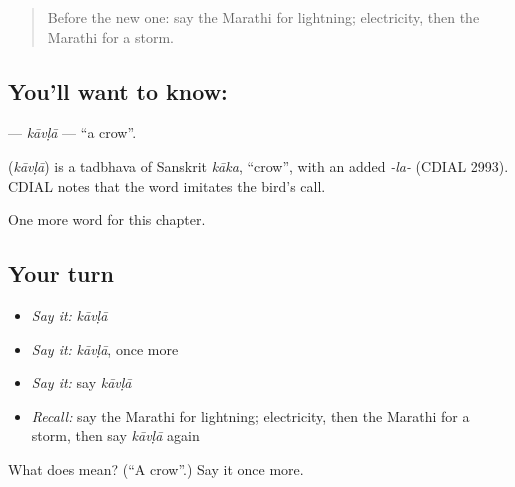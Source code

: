 \label{lesson:MR-C141-kavla}



\begin{quote}
Before the new one: say the Marathi for lightning; electricity, then the Marathi for a storm.
\end{quote}

\subsection*{You'll want to know: }
\textbf{} — \emph{kāvḷā} — \textquotedblleft{}a crow\textquotedblright{}.

\begin{cousinweb}
\textbf{} (\emph{kāvḷā}) is a tadbhava of Sanskrit \emph{kāka}, \textquotedblleft{}crow\textquotedblright{}, with an added \emph{-la-} (CDIAL 2993). CDIAL notes that the word imitates the bird's call.
\end{cousinweb}

\begin{grammarlens}[title={What you've built}]
One more word for this chapter.
\end{grammarlens}

\subsection*{Your turn}
\begin{itemize}
\raggedright
  \item \emph{Say it:} \emph{kāvḷā}
  \item \emph{Say it:} \emph{kāvḷā}, once more
  \item \emph{Say it:} say \emph{kāvḷā}
  \item \emph{Recall:} say the Marathi for lightning; electricity, then the Marathi for a storm, then say \emph{kāvḷā} again
\end{itemize}

\begin{tcolorbox}[breakable,colback=teal!4,colframe=teal!35!black,title={Before you move on}]
What does  mean? (\textquotedblleft{}A crow\textquotedblright{}.) Say it once more.
\end{tcolorbox}

